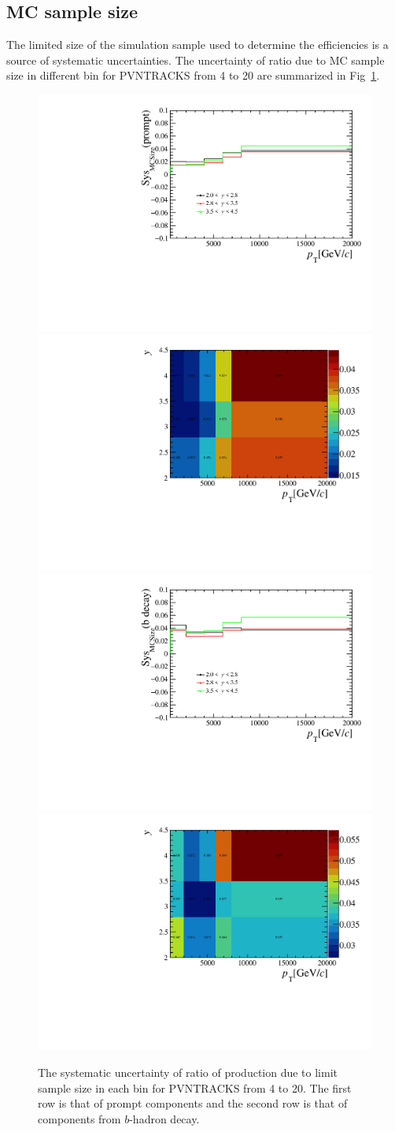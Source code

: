 \subsection{MC sample size}
\label{sec:MCSize}
The limited size of the simulation sample used to determine the efficiencies is a source of systematic uncertainties. 
The uncertainty of ratio due to MC sample size in different bin for PVNTRACKS from 4 to 20 are 
summarized in Fig~\ref{Sys_MCSize}.
\begin{figure}[!tbp]
    \begin{center}
      \includegraphics[width=0.49\linewidth]{pdf/SysMCSize/n1Errp_point.pdf}
      \includegraphics[width=0.49\linewidth]{pdf/SysMCSize/n1Errp.pdf}
      \vspace*{-0.5cm}
      \includegraphics[width=0.49\linewidth]{pdf/SysMCSize/n1Errb_point.pdf}
      \includegraphics[width=0.49\linewidth]{pdf/SysMCSize/n1Errb.pdf}
    \end{center}
    \caption{The systematic uncertainty of ratio of production due to limit sample size in each bin for PVNTRACKS from 4 to 20. The first row is that of prompt components and the second row is that of components from $b$-hadron decay.
      }
    \label{Sys_MCSize}
\end{figure}

